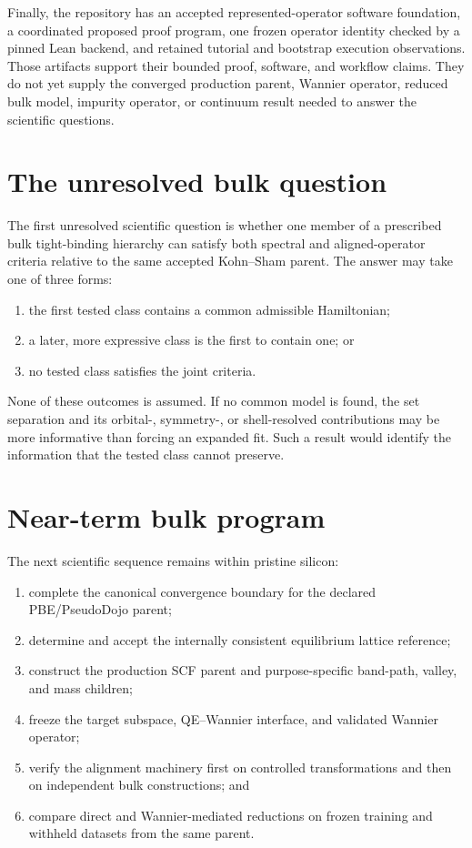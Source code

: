 Finally, the repository has an accepted represented-operator software
foundation, a coordinated proposed proof program, one frozen operator identity
checked by a pinned Lean backend, and retained tutorial and bootstrap execution
observations. Those artifacts support their bounded proof, software, and
workflow claims. They do not yet
supply the converged production parent, Wannier operator, reduced bulk model,
impurity operator, or continuum result needed to answer the scientific
questions.

\section{The unresolved bulk question}

The first unresolved scientific question is whether one member of a prescribed
bulk tight-binding hierarchy can satisfy both spectral and aligned-operator
criteria relative to the same accepted Kohn--Sham parent. The answer may take
one of three forms:

\begin{enumerate}
  \item the first tested class contains a common admissible Hamiltonian;
  \item a later, more expressive class is the first to contain one; or
  \item no tested class satisfies the joint criteria.
\end{enumerate}

None of these outcomes is assumed. If no common model is found, the set
separation and its orbital-, symmetry-, or shell-resolved contributions may be
more informative than forcing an expanded fit. Such a result would identify the
information that the tested class cannot preserve.

\section{Near-term bulk program}

The next scientific sequence remains within pristine silicon:

\begin{enumerate}
  \item complete the canonical convergence boundary for the declared
    PBE/PseudoDojo parent;
  \item determine and accept the internally consistent equilibrium lattice
    reference;
  \item construct the production SCF parent and purpose-specific band-path,
    valley, and mass children;
  \item freeze the target subspace, QE--Wannier interface, and validated Wannier
    operator;
  \item verify the alignment machinery first on controlled transformations and
    then on independent bulk constructions; and
  \item compare direct and Wannier-mediated reductions on frozen training and
    withheld datasets from the same parent.
\end{enumerate}

